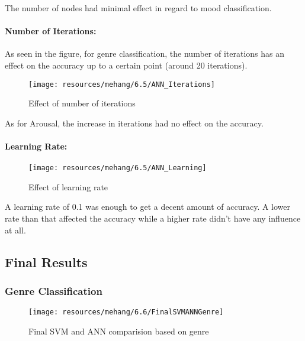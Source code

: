 The number of nodes had minimal effect in regard to mood classification. 

\paragraph{Number of Iterations:}
As seen in the figure, for genre classification, the number of iterations has an effect on the accuracy up to a certain point (around 20 iterations).\\

\begin{figure}[h!]
        \centering
        \texttt{[image: resources/mehang/6.5/ANN\_Iterations]}
        \caption{Effect of number of iterations}
\end{figure}

As for Arousal, the increase in iterations had no effect on the accuracy. 

\paragraph{Learning Rate:}
\begin{figure}[h!]
        \centering
        \texttt{[image: resources/mehang/6.5/ANN\_Learning]}
        \caption{Effect of learning rate}
\end{figure}
A learning rate of 0.1 was enough to get a decent amount of accuracy. A lower rate than that affected the accuracy while a higher rate didn’t have any influence at all.
\newpage
\subsection{Final Results}
\subsubsection{Genre Classification}
\begin{figure}[h!]
        \centering
        \texttt{[image: resources/mehang/6.6/FinalSVMANNGenre]}
        \caption{Final SVM and ANN comparision based on genre}
\end{figure}

